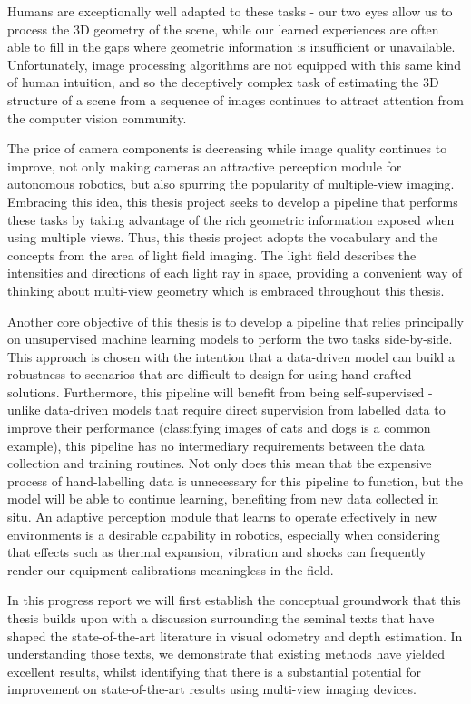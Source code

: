\documentclass[openany]{book}
\begin{document}
Humans are exceptionally well adapted to these tasks - our two eyes allow us to process the 3D geometry of the scene, while our learned experiences are often able to fill in the gaps where geometric information is insufficient or unavailable. Unfortunately, image processing algorithms are not equipped with this same kind of human intuition, and so the deceptively complex task of estimating the 3D structure of a scene from a sequence of images continues to attract attention from the computer vision community. 


The price of camera components is decreasing while image quality continues to improve, not only making cameras an attractive perception module for autonomous robotics, but also spurring the popularity of multiple-view imaging. Embracing this idea, this thesis project seeks to develop a pipeline that performs these tasks by taking advantage of the rich geometric information exposed when using multiple views. Thus, this thesis project adopts the vocabulary and the concepts from the area of light field imaging. The light field describes the intensities and directions of each light ray in space, providing a convenient way of thinking about multi-view geometry which is embraced throughout this thesis.


Another core objective of this thesis is to develop a pipeline that relies principally on unsupervised machine learning models to perform the two tasks side-by-side. This approach is chosen with the intention that a data-driven model can build a robustness to scenarios that are difficult to design for using hand crafted solutions.  Furthermore, this pipeline will benefit from being self-supervised - unlike data-driven models that require direct supervision from labelled data to improve their performance (classifying images of cats and dogs is a common example), this pipeline has no intermediary requirements between the data collection and training routines. Not only does this mean that the expensive process of hand-labelling data is unnecessary for this pipeline to function, but the model will be able to continue learning, benefiting from new data collected in situ. An adaptive perception module that learns to operate effectively in new environments is a desirable capability in robotics, especially when considering that effects such as thermal expansion, vibration and shocks can frequently render our equipment calibrations meaningless in the field. 

In this progress report we will first establish the conceptual groundwork that this thesis builds upon with a discussion surrounding the seminal texts that have shaped the state-of-the-art literature in visual odometry and depth estimation. In understanding those texts, we demonstrate that existing methods have yielded excellent results, whilst identifying that there is a substantial potential for improvement on state-of-the-art results using multi-view imaging devices. 
\end{document}

